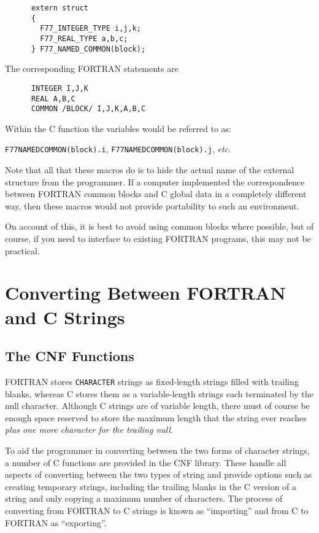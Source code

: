 \documentclass[twoside,11pt]{article}
\newcommand{\xlabel}[1]{}
\renewcommand{\_}{\texttt{\symbol{95}}}
\begin{document}
{\small \begin{verbatim}
      extern struct
      {
        F77_INTEGER_TYPE i,j,k;
        F77_REAL_TYPE a,b,c;
      } F77_NAMED_COMMON(block);
\end{verbatim} }

The corresponding FORTRAN statements are

{\small \begin{verbatim}
      INTEGER I,J,K
      REAL A,B,C
      COMMON /BLOCK/ I,J,K,A,B,C
\end{verbatim} }

Within the C function the variables would be referred to as:

\texttt{F77\_\-NAMED\_\-COMMON(block).i}, 
\texttt{F77\_\-NAMED\_\-COMMON(block).j}, 
\textit{etc.}

Note that all that these macros do is to hide the actual name of the external
structure from the programmer. If a computer implemented the correspondence
between FORTRAN common blocks and C global data in a completely different way,
then these macros would not provide portability to such an environment.

On account of this, it is best to avoid using common blocks where possible, but
of course, if you need to interface to existing FORTRAN programs, this may not
be practical.

\section{\xlabel{converting_between_fortran_and_c_strings}Converting Between FORTRAN and C Strings}

\subsection{\xlabel{the_cnf_functions}\label{cnf}The CNF Functions}
FORTRAN stores \texttt{CHARACTER} strings as fixed-length strings 
filled with trailing blanks, whereas C stores them as a variable-length strings
each terminated by the null character. 
Although C strings are of variable length,
there must of course be enough space reserved to store the maximum length that
the string ever reaches \textit{plus one more character for the trailing null}.

To aid the programmer in converting between the two forms of character strings,
a number of C functions are provided in the CNF library.
These handle all aspects of converting between the two types of string and 
provide options such as creating temporary strings, including the trailing 
blanks in the C version of a string and only copying a maximum number of 
characters. 
The process of converting from FORTRAN to C strings is known as ``importing''
and from C to FORTRAN as ``exporting''.
\end{document}
